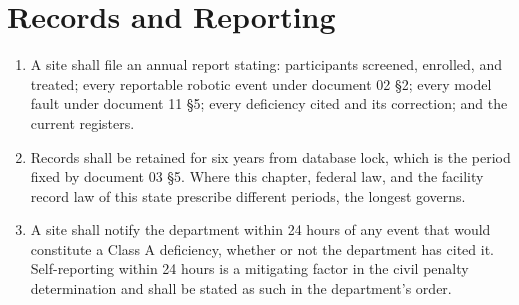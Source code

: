\section{Records and Reporting}

\begin{enumerate}
\item A site shall file an annual report stating: participants screened,
  enrolled, and treated; every reportable robotic event under document 02 §2;
  every model fault under document 11 §5; every deficiency cited and its
  correction; and the current registers.

\item Records shall be retained for six years from database lock, which is the
  period fixed by document 03 §5. Where this chapter, federal law, and the
  facility record law of this state prescribe different periods, the longest
  governs.

\item A site shall notify the department within 24 hours of any event that would
  constitute a Class A deficiency, whether or not the department has cited it.
  Self-reporting within 24 hours is a mitigating factor in the civil penalty
  determination and shall be stated as such in the department's order.
\end{enumerate}
